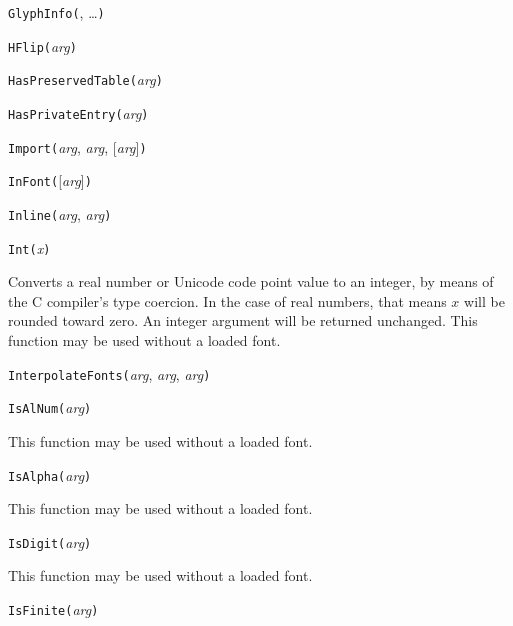 
\noindent\texttt{GlyphInfo(}, \ldots\texttt{)}


\noindent\texttt{HFlip(}\textit{arg}\texttt{)}


\noindent\texttt{HasPreservedTable(}\textit{arg}\texttt{)}


\noindent\texttt{HasPrivateEntry(}\textit{arg}\texttt{)}


\noindent\texttt{Import(}\textit{arg}, \textit{arg}, [\textit{arg}]\texttt{)}


\noindent\texttt{InFont(}[\textit{arg}]\texttt{)}


\noindent\texttt{Inline(}\textit{arg}, \textit{arg}\texttt{)}


\noindent\texttt{Int(}\textit{x}\texttt{)}

Converts a real number or Unicode code point value to an integer, by means
of the C compiler's type coercion.  In the case of real numbers, that means
$x$ will be rounded toward zero.  An integer argument will be returned
unchanged.
This function may be used without a loaded font.


\noindent\texttt{InterpolateFonts(}\textit{arg}, \textit{arg}, \textit{arg}\texttt{)}


\noindent\texttt{IsAlNum(}\textit{arg}\texttt{)}

This function may be used without a loaded font.


\noindent\texttt{IsAlpha(}\textit{arg}\texttt{)}

This function may be used without a loaded font.


\noindent\texttt{IsDigit(}\textit{arg}\texttt{)}

This function may be used without a loaded font.


\noindent\texttt{IsFinite(}\textit{arg}\texttt{)}

